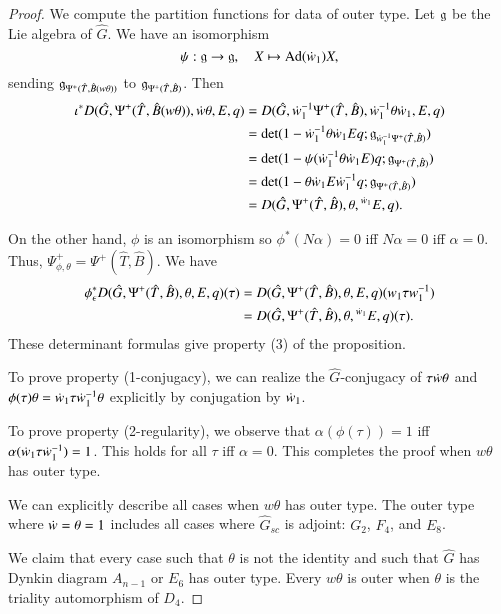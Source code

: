 \begin{proof}
We compute the partition functions for data of outer type.
Let ${\mathfrak g}$ be the Lie algebra of $\hat G$.  We have an isomorphism
\[
\psi:{\mathfrak g}\to {\mathfrak g},\quad X\mapsto {\operatorname{Ad}}(\dot w_1) X,
\]
sending ${\mathfrak g}_{\Psi^+(\hat T,\hat B(w\theta))}$ to ${\mathfrak g}_{\Psi^+(\hat T,\hat B)}$.  Then
\begin{align*}
\iota^* D(\hat G,\Psi^+(\hat T,\hat B(w\theta)),\dot w\theta,E,q) &=
D(\hat G,\dot w_1^{-1}\Psi^+(\hat T,\hat B),\dot w_1^{-1}\theta \dot w_1,E,q) \\ &=
\det(1-\dot w_1^{-1} \theta\dot w_1 E q; {\mathfrak g}_{\dot w_1^{-1}\Psi^+(\hat T,\hat B)}) \\ &=
\det(1 - \psi(\dot w_1^{-1} \theta\dot w_1 E) q; {\mathfrak g}_{\Psi^+(\hat T,\hat B)}) \\ &=
\det(1- \theta \dot w_1 E \dot w_1^{-1} q;{\mathfrak g}_{\Psi^+(\hat T,\hat B)}) \\ &=
D(\hat G,\Psi^+(\hat T,\hat B),\theta,{}^{\dot w_1} E,q).
\end{align*}

On the other hand, $\phi$ is an isomorphism so $\phi^*(N\alpha)=0$ iff
$N\alpha=0$ iff $\alpha=0$.  Thus, $\Psi_{\phi,\theta}^+ = 
\Psi^+(\hat T,\hat B)$.  We have
\begin{align*}
\phi^*_\epsilon D(\hat G,\Psi^+(\hat T,\hat B),\theta,E,q)(\tau) &=
D(\hat G,\Psi^+(\hat T,\hat B),\theta,E,q) (w_1\tau w_1^{-1}) \\ &=
D(\hat G,\Psi^+(\hat T,\hat B),\theta,{}^{\dot w_1} E,q) (\tau).
\end{align*}
These determinant formulas give property (3) of the proposition.

To prove property (1-conjugacy), we can realize the $\hat G$-conjugacy
of $\tau \dot w \theta$ and $\phi(\tau)\theta = \dot w_1\tau
\dot w_1^{-1}\theta$ explicitly by conjugation by $\dot w_1$.

To prove property (2-regularity), we observe that
$\alpha(\phi(\tau))=1$ iff $\alpha(\dot w_1\tau\dot w_1^{-1})=1$.  This
holds for all $\tau$ iff $\alpha=0$.
This completes the proof when $w\theta$ has outer type.


We can explicitly describe all cases when $w\theta$ has outer type.
The outer type where $\dot w = \theta=1$ includes all cases
where $\hat G_{sc}$ is adjoint: $G_2$, $F_4$, and $E_8$.

We claim that every case such that $\theta$ is not the identity and
such that $\hat G$ has Dynkin diagram $A_{n-1}$ or $E_6$ has outer type.
Every $w\theta$ is outer when $\theta$ is the triality automorphism of $D_4$.


\end{proof}
